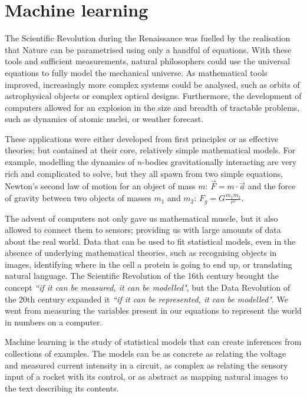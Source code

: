 \chapter{Machine learning}

The Scientific Revolution during the Renaissance 
was fuelled by the realisation that Nature can be parametrised using only a handful of equations.
With these tools and sufficient measurements, natural philosophers could use the universal equations to fully model the mechanical universe.
As mathematical tools improved, increasingly more complex systems could be analysed, such as orbits of astrophysical objects or complex optical designs.
Furthermore, the development of computers allowed for an explosion in the size and breadth of tractable problems, such as dynamics of atomic nuclei, or weather forecast.

These applications were either developed from first principles or as effective theories; but contained at their core, relatively simple mathematical models.
For example, modelling the dynamics of $n$-bodies gravitationally interacting are very rich and complicated to solve, but they all spawn from two simple equations, Newton's second law of motion for an object of mass $m$: $\vec{F} = m \cdot \vec{a}$ and the force of gravity between two objects of masses $m_1$ and $m_2$: $F_g=G\frac{m_1  m_2}{r^2}$.

The advent of computers
 not only gave us mathematical muscle, but it also allowed to connect them to sensors;
providing us with large amounts of data about the real world.
Data that can be used to fit statistical models, even in the absence of underlying mathematical theories, such as recognising objects in images, identifying where in the cell a protein is going to end up, or translating natural language.
The Scientific Revolution of the 16th century brought the concept \emph{``if it can be measured, it can be modelled"}, but the Data Revolution of the 20th century expanded it \emph{``if it can be \emph{represented}, it can be modelled"}.
We went from measuring the variables present in our equations to represent the world in numbers on a computer.


Machine learning 
is the study of statistical models that can create inferences from collections of examples. 
The models can be as concrete as relating the voltage and measured current intensity in a circuit, as complex as relating the sensory input of a rocket with its control, or as abstract as mapping natural images to the text describing its contents.


